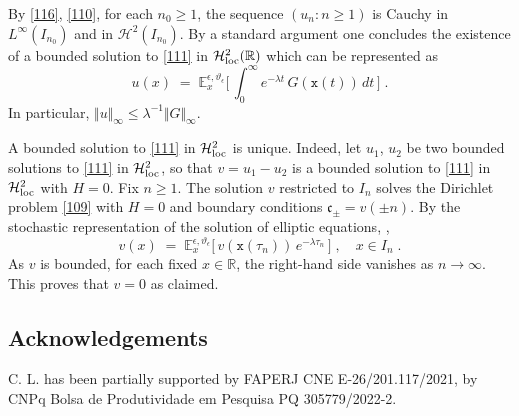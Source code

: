 \documentclass[reqno]{amsart}
\theoremstyle{plain}
\theoremstyle{definition}
\newcommand{\mc}[1]{{\mathcal #1}}
\newcommand{\mf}[1]{{\mathfrak #1}}
\newcommand{\bb}[1]{{\mathbb #1}}
\newcommand{\mtt}[1]{{\mathtt #1}}
\newcounter{as}[section]
\newcommand{\<}{\langle}
\renewcommand{\>}{\rangle}
\begin{document}
By \eqref{116}, \eqref{110}, for each $n_0\ge 1$, the sequence
$(u_n:n\ge 1)$ is Cauchy in $L^\infty(I_{n_0})$ and in
$\mc H^2(I_{n_0})$. By a standard argument one concludes the existence
of a bounded solution to \eqref{111} in $\mc H^2_{\rm loc}(\bb R)$
which can be represented as
\begin{equation}
\label{112}
u(x) \;=\;
\bb E^{\epsilon, \vartheta_\epsilon}_x\Big[ \, \int_0^{\infty}
e^{-\lambda t}\, G( \mtt x(t))\,dt\, \Big] \;.
\end{equation}
In particular,
$\Vert u \Vert_\infty \le \lambda^{-1} \Vert G\Vert_\infty$.

A bounded solution to \eqref{111} in $\mc H^2_{\rm loc}$ is unique.
Indeed, let $u_1$, $u_2$ be two bounded solutions to \eqref{111} in
$\mc H^2_{\rm loc}$, so that $v=u_1-u_2$ is a bounded solution to
\eqref{111} in $\mc H^2_{\rm loc}$ with $H=0$. Fix $n\ge 1$.  The
solution $v$ restricted to $I_n$ solves the Dirichlet problem
\eqref{109} with $H=0$ and boundary conditions $\mf c_\pm = v(\pm n)$.
By the stochastic representation of the solution of elliptic
equations, \cite[Theorem 6.5.1]{Fri},
\begin{equation*}
v(x) \;=\;
\bb E^{\epsilon, \vartheta_\epsilon}_x\Big[ \, v(\mtt x(\tau_n)) \, 
e^{-\lambda \tau_n} \, \Big] \;, \quad x\in I_n\;.
\end{equation*}
As $v$ is bounded, for each fixed $x\in \bb R$, the right-hand side
vanishes as $n\to\infty$. This proves that $v=0$ as claimed.

\subsection*{Acknowledgements}
C. L. has been partially supported by FAPERJ CNE E-26/201.117/2021, by
CNPq Bolsa de Produtividade em Pesquisa PQ 305779/2022-2.
\end{document}
